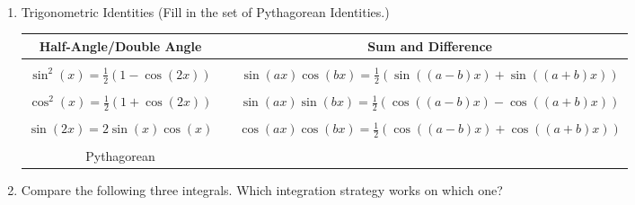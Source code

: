 \documentclass[11pt,fleqn]{article}
\begin{document}
\renewcommand{\headrulewidth}{0pt}
\newcommand{\blank}[1]{\rule{#1}{0.75pt}}
\newcommand{\bc}{\begin{center}}
\newcommand{\ec}{\end{center}}
\renewcommand{\d}{\displaystyle}

\vspace*{-0.7in}

\begin{center}
  \large
  \\
   
\end{center}

\begin{enumerate}
\item Trigonometric Identities (Fill in the set of Pythagorean Identities.)\\

\begin{tabular}{ccc}
Half-Angle/Double Angle && Sum and Difference\\
\hline
&&\\
$\sin^2(x)=\frac{1}{2} ( 1-\cos(2x))$&&$\sin(ax)\cos(bx)=\frac{1}{2} ( \sin((a-b)x)+\sin((a+b)x))$\\ &&\\

 $\cos^2(x)=\frac{1}{2} ( 1+\cos(2x))$&&$\sin(ax)\sin(bx)=\frac{1}{2} ( \cos((a-b)x)-\cos((a+b)x))$\\ &&\\
 
$\sin(2x)=2\sin(x)\cos(x)$ &&$\cos(ax)\cos(bx)=\frac{1}{2} ( \cos((a-b)x)+\cos((a+b)x))$\\ &&\\
Pythagorean \quad \hspace{.8 in} \quad&&\\
\hline
\end{tabular}
\vspace{1in}


\item Compare the following three integrals. Which integration strategy works on which one?\\


\end{enumerate}
\end{document}
